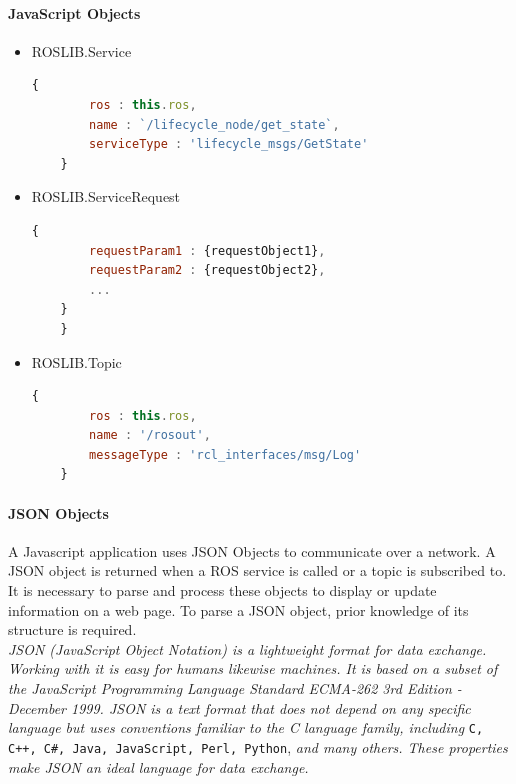 \paragraph{JavaScript Objects}
\begin{itemize}

\item ROSLIB.Service
\begin{lstlisting}[language=JavaScript,
	caption={JavaScript object definition for Service}]
	{
		ros : this.ros,
		name : `/lifecycle_node/get_state`,
		serviceType : 'lifecycle_msgs/GetState'
	}
\end{lstlisting}

\item ROSLIB.ServiceRequest
\begin{lstlisting}[language=JavaScript,
	caption={JavaScript object definition for ServiceRequest}]
	{
		requestParam1 : {requestObject1},
		requestParam2 : {requestObject2},
		...
    }
	}
\end{lstlisting}


\item ROSLIB.Topic
\begin{lstlisting}[language=JavaScript,
	caption={JavaScript object definition for Topic}]
	{
		ros : this.ros,
		name : '/rosout',
		messageType : 'rcl_interfaces/msg/Log'
	}
\end{lstlisting}
\end{itemize}

\paragraph{JSON Objects} A Javascript application uses JSON Objects to communicate over a network. A JSON object is returned when a ROS service is called or a topic is subscribed to. It is necessary to parse and process these objects to display or update information on a web page. To parse a JSON object, prior knowledge of its structure is required. \\

 \textit{JSON (JavaScript Object Notation) is a lightweight format for data exchange. Working with it is easy for humans likewise machines. It is based on a subset of the JavaScript Programming Language Standard ECMA-262 3rd Edition - December 1999. JSON is a text format that does not depend on any specific language but uses conventions familiar to the C language family, including} \lstinline{C, C++, C#, Java, JavaScript, Perl, Python}, \textit{and many others. These properties make JSON an ideal language for data exchange.}\cite{jsonDef} \\

